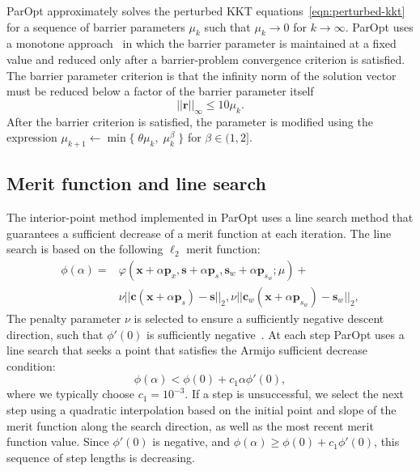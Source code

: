 \documentclass[12pt]{article}
\newcommand{\mb}{\mathbf}
\begin{document}
ParOpt approximately solves the perturbed KKT equations~\eqref{eqn:perturbed-kkt} for a sequence of barrier parameters $\mu_{k}$ such that $\mu_{k} \rightarrow 0$ for $k \rightarrow \infty$. 
ParOpt uses a monotone approach~\citet{Fiacco:McCormick:1990} in which the barrier parameter is maintained at a fixed value and reduced only after a barrier-problem convergence criterion is satisfied.
The barrier parameter criterion is that the infinity norm of the solution vector must be reduced below a factor of the barrier parameter itself
%
\begin{equation}
  \label{eqn:barrier-stopping-criterion}
  ||\mb{r}||_{\infty}  \le 10 \mu_{k}.
\end{equation}
After the barrier criterion is satisfied, the parameter is modified using the expression $\mu_{k+1} \leftarrow \min \{ \; \theta \mu_{k},\; \mu_{k}^{\beta}\;\}$ for $\beta \in (1, 2]$.

\subsection{Merit function and line search}

The interior-point method implemented in ParOpt uses a line search method that guarantees a sufficient decrease of a merit function at each iteration.
The line search is based on the following $\ell_{2}$ merit function:
%
\begin{equation}
  \label{eqn:merit-function}
  \begin{aligned}
    \phi(\alpha) = & \varphi(\mb{x} + \alpha\mb{p}_{x}, \mb{s} + \alpha\mb{p}_{s}, \mb{s}_{w} + \alpha\mb{p}_{s_{w}}; \mu) + \\
    & \nu ||\mb{c}(\mb{x} + \alpha\mb{p}_{s}) - \mb{s}||_{2},
    \nu ||\mb{c}_{w}(\mb{x} + \alpha\mb{p}_{s_{w}}) - \mb{s}_{w}||_{2},
  \end{aligned}
\end{equation}
%
The penalty parameter $\nu$ is  selected to ensure a sufficiently negative descent direction, such that $\phi'(0)$ is sufficiently negative~\citep{Nocedal.Wright}. 
At each step ParOpt uses a line search that seeks a point that satisfies the Armijo sufficient decrease condition:
%
\begin{equation*}
  \phi(\alpha) < \phi(0) + c_{1} \alpha \phi'(0),
\end{equation*}
where we typically choose $c_{1} = 10^{-3}$. If a step is unsuccessful, we select the next step using a quadratic interpolation based on the initial point and slope of the merit function along the search direction, as well as the most recent merit function value. 
Since $\phi'(0)$ is negative, and $\phi(\alpha) \ge \phi(0) + c_{1} \phi'(0)$, this sequence of step lengths is decreasing.
\end{document}

